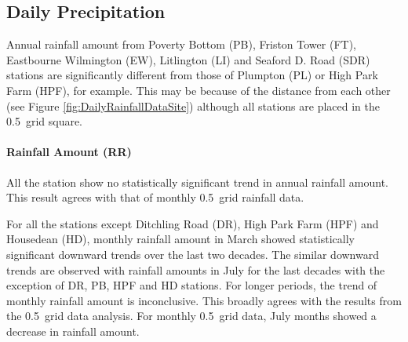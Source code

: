 \subsection{Daily Precipitation}
\label{sec:DailyRainfallStationData}

Annual rainfall amount from Poverty Bottom (PB), Friston Tower (FT), Eastbourne
Wilmington (EW), Litlington (LI) and Seaford D. Road (SDR) stations are
significantly different from those of Plumpton (PL) or High Park Farm (HPF), for
example. This may be because of the distance from each other (see Figure
\ref{fig:DailyRainfallDataSite}) although all stations are placed in the
0.5\textdegree\ grid square.


\paragraph{Rainfall Amount (RR)}
\label{sec:RainfallAmountRR}

All the station show no statistically significant trend in annual rainfall
amount. This result agrees with that of monthly 0.5\textdegree\ grid rainfall
data.

For all the stations except Ditchling Road (DR), High Park Farm (HPF) and
Housedean (HD), monthly rainfall amount in March showed statistically
significant downward trends over the last two decades. The similar downward
trends are observed with rainfall amounts in July for the last decades with the
exception of DR, PB, HPF and HD stations. For longer periods, the trend of
monthly rainfall amount is inconclusive. This broadly agrees with the results
from the 0.5\textdegree\ grid data analysis. For monthly 0.5\textdegree\ grid
data, July months showed a decrease in rainfall amount.

